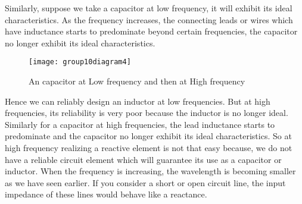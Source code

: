 Similarly, suppose we take a capacitor at low frequency, it will exhibit its ideal characteristics. As the frequency increases, the connecting leads or wires which have inductance starts to predominate beyond certain frequencies, the capacitor no longer exhibit its ideal characteristics.\\

\begin{figure}[h]
	\centering
	\texttt{[image: group10diagram4]}
	\caption{An capacitor at Low frequency and then at High frequency}
\end{figure}
Hence we can reliably design an inductor at low frequencies. But at high frequencies, its reliability is very poor because the inductor is no longer ideal. Similarly for a capacitor at high frequencies, the lead inductance starts to predominate and the capacitor no longer exhibit its ideal characteristics. So at high frequency realizing a reactive element is not that easy because, we do not have a reliable circuit element which will guarantee its use as a capacitor or inductor. When the frequency is increasing, the wavelength is becoming smaller as we have seen earlier. 
If you consider a short or open circuit line, the input impedance of these lines would behave like a reactance.

